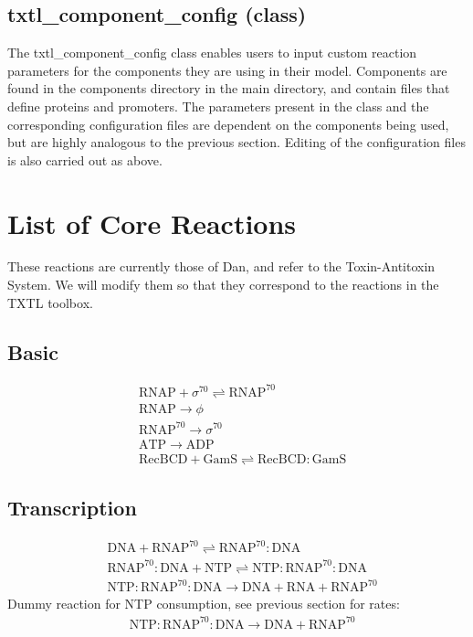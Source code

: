 \documentclass[english]{report}
\begin{document}
		\subsection*{txtl\_component\_config (class)}	
		The txtl\_component\_config class enables users to input custom reaction parameters for the components they are using in their model. Components are found in the \textsf{components} directory in the main directory, and contain files that define proteins and promoters. The parameters present in the class and the corresponding configuration files are dependent on the components being used, but are highly analogous to the previous section. Editing of the configuration files is also carried out as above. 

	\section{List of Core Reactions}
	These reactions are currently those of Dan, and refer to the Toxin-Antitoxin System. We will modify them so that they correspond to the reactions in the TXTL toolbox. 
	
	
	\subsection{Basic}

\begin{align}
& \mathrm{RNAP} + \sigma^{70} \rightleftharpoons \mathrm{RNAP^{70}} \\
& \mathrm{RNAP} \rightarrow \phi \\
& \mathrm{RNAP^{70}} \rightarrow \sigma^{70} \\
& \mathrm{ATP} \rightarrow \mathrm{ADP} \\
& \mathrm{RecBCD} + \mathrm{GamS} \rightleftharpoons \mathrm{RecBCD}\!:\!\mathrm{GamS} 
\end{align}
	
	\subsection{Transcription}

\begin{align}
& \mathrm{DNA} + \mathrm{RNAP^{70}} \rightleftharpoons \mathrm{RNAP^{70}}\!:\!\mathrm{DNA} \\
& \mathrm{RNAP^{70}}\!:\!\mathrm{DNA} + \mathrm{NTP} \rightleftharpoons \mathrm{NTP}\!:\!\mathrm{RNAP^{70}}\!:\!\mathrm{DNA} \\
& \mathrm{NTP}\!:\!\mathrm{RNAP^{70}}\!:\!\mathrm{DNA} \rightarrow \mathrm{DNA} +  \mathrm{RNA} + \mathrm{RNAP^{70}} 
\end{align}
Dummy reaction for NTP consumption, see previous section for rates:\\
\begin{align}
& \mathrm{NTP}\!:\!\mathrm{RNAP^{70}}\!:\!\mathrm{DNA} \rightarrow \mathrm{DNA} + \mathrm{RNAP^{70}} 
\end{align}
\end{document}

